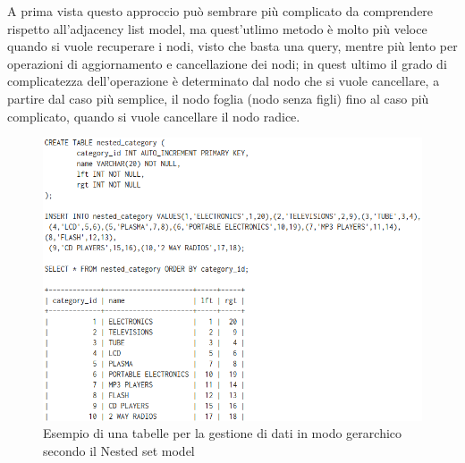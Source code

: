 A prima vista questo approccio può sembrare più complicato da comprendere rispetto all'adjacency list model, ma quest'utlimo metodo è
molto più veloce quando si vuole recuperare i nodi, visto che basta una query, mentre più lento per operazioni di aggiornamento e 
cancellazione dei nodi; in quest ultimo il grado di complicatezza dell'operazione è determinato dal nodo che si vuole cancellare, a 
partire dal caso più semplice, il nodo foglia (nodo senza figli) fino al caso più complicato, quando si vuole cancellare il nodo radice. \\

\begin{figure}[ht!]
    \centering
	\includegraphics[scale=0.6]{images/Nested_Tree_Model_table.PNG}
	\caption{Esempio di una tabelle per la gestione di dati in modo gerarchico secondo il Nested set model}
\end{figure}


